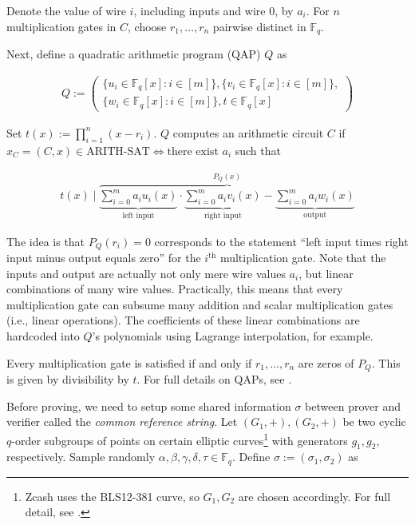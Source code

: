 \documentclass{article}
\begin{document}
Denote the value of wire $i$, including inputs and wire $0$, by $a_i$.
For $n$ multiplication gates in $C$, choose $r_1, \ldots, r_n$ pairwise distinct in $\mathbb{F}_q$.

Next, define a quadratic arithmetic program (QAP) $Q$ as

\begin{align*}
        Q := \left(\begin{aligned}\{u_i \in \mathbb{F}_q[x] \colon i \in [m]\}, \{v_i \in \mathbb{F}_q[x] \colon i \in [m]\},\\
        \{w_i \in \mathbb{F}_q[x] \colon i \in [m]\}, t \in \mathbb{F}_q[x]\end{aligned}\right)
\end{align*}

Set $t(x) := \prod_{i=1}^n(x-r_i)$.
$Q$ computes an arithmetic circuit $C$ if $x_C = (C,x) \in \text{ARITH-SAT} \iff \text{there exist } a_i$ such that

\begin{align*}
        t(x) \mid \overbrace{\underbrace{\sum_{i=0}^m a_iu_i(x)}_\text{left input} \cdot \underbrace{\sum_{i=0}^m a_iv_i(x)}_\text{right input} - \underbrace{\sum_{i=0}^{m} a_iw_i(x)}_\text{output}}^\text{$P_Q(x)$}
\end{align*}

The idea is that $P_Q(r_i) = 0$ corresponds to the statement ``left input times right input minus output equals zero'' for the $i^\text{th}$ multiplication gate.
Note that the inputs and output are actually not only mere wire values $a_i$, but linear combinations of many wire values.
Practically, this means that every multiplication gate can subsume many addition and scalar multiplication gates (i.e., linear operations).
The coefficients of these linear combinations are hardcoded into $Q$'s polynomials using Lagrange interpolation, for example.

Every multiplication gate is satisfied if and only if $r_1,\ldots,r_n$ are zeros of $P_Q$.
This is given by divisibility by $t$.
For full details on QAPs, see \cite{gennaro:qap}.

Before proving, we need to setup some shared information $\sigma$ between prover and verifier called the \textit{common reference string}.
Let $(G_1, +), (G_2, +)$ be two cyclic $q$-order subgroups of points on certain elliptic curves\footnote{Zcash uses the BLS12-381\cite{barreto:bls} curve, so $G_1,G_2$ are chosen accordingly. For full detail, see \cite{hopwood:zcash}. } with generators $g_1, g_2$, respectively.
Sample randomly $\alpha, \beta, \gamma, \delta, \tau \in \mathbb{F}_q$. Define $\sigma := (\sigma_1, \sigma_2)$ as
\end{document}
